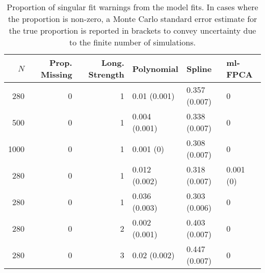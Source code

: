 \begin{table}[ht]
\centering
\begin{tabular}{rrrlll}
  \toprule
{\bfseries \small $N$} & {\bfseries \small Prop. Missing} & {\bfseries \small Long. Strength} & {\bfseries \small Polynomial} & {\bfseries \small Spline} & {\bfseries \small ml-FPCA} \\ 
  \midrule
280 & 0 & 1 & 0.01 (0.001) & 0.357 (0.007) & 0 \\ 
  500 & 0 & 1 & 0.004 (0.001) & 0.338 (0.007) & 0 \\ 
  1000 & 0 & 1 & 0.001 (0) & 0.308 (0.007) & 0 \\ 
  280 & 0 & 1 & 0.012 (0.002) & 0.318 (0.007) & 0.001 (0) \\ 
  280 & 0 & 1 & 0.036 (0.003) & 0.303 (0.006) & 0 \\ 
  280 & 0 & 2 & 0.002 (0.001) & 0.403 (0.007) & 0 \\ 
  280 & 0 & 3 & 0.02 (0.002) & 0.447 (0.007) & 0 \\ 
   \bottomrule
\end{tabular}
\caption{Proportion of singular fit warnings from the model fits. In cases where the proportion is non-zero, a Monte Carlo standard error estimate for the true proportion is reported in brackets to convey uncertainty due to the finite number of simulations.} 
\label{tab:singularity-table}
\end{table}
